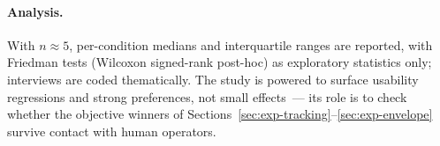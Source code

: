\paragraph{Analysis.}
With \(n\approx5\), per-condition medians and interquartile ranges are
reported, with Friedman tests (Wilcoxon signed-rank post-hoc) as
exploratory statistics only; interviews are coded thematically. The study
is powered to surface usability regressions and strong preferences, not
small effects~--- its role is to check whether the objective winners of
Sections~\ref{sec:exp-tracking}--\ref{sec:exp-envelope} survive contact
with human operators.
